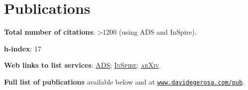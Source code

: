 \documentclass[a4paper]{moderncv}
\begin{document}
\section{Publications}

\textcolor{mark_color}{\textbf{Total number of citations}}:  {>1200}  (using ADS and InSpire).

\textcolor{mark_color}{\textbf{h-index}}: 17

\textcolor{mark_color}{\textbf{Web links to list services}}:
\href{http://labs.adsabs.harvard.edu/adsabs/search/?q=author%3A%22Gerosa%2C+Davide%22&month_from=&year_from=&month_to=&year_to=&db_f=&nr=&article=1&bigquery=&re_sort_type=CITED&re_sort_dir=desc}{\textsc{ADS}};
\href{http://inspirehep.net/search?ln=en&ln=en&p=exactauthor%3AD.Gerosa.1&of=hb&action_search=Search&sf=&so=d&rm=citation&rg=25&sc=0}{\textsc{InSpire}};
\href{http://arxiv.org/a/gerosa_d_1.html}{\textsc{arXiv}}.

\textbf{Full list of publications} available below and at \href{http://www.davidegerosa.com/pub}{\texttt{www.davidegerosa.com/pub}}.



\end{document}
